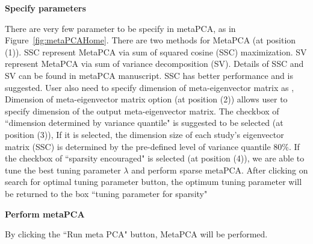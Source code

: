 \begin{steps}

\item \textbf{Specify parameters} 

There are very few parameter to be specify in metaPCA, as in Figure~\ref{fig:metaPCAHome}.
There are two methods for MetaPCA (at position {\color{red} (1)}). 
SSC represent MetaPCA via sum of squared cosine (SSC) maximization.
SV represent MetaPCA via sum of variance decomposition (SV).
Details of SSC and SV can be found in metaPCA manuscript.
SSC has better performance and is suggested.
User also need to specify dimension of meta-eigenvector matrix as , 
Dimension of meta-eigenvector matrix option (at position {\color{red} (2)}) allows user to specify dimension of the output meta-eigenvector matrix.
The checkbox of ``dimension determined by variance quantile" is suggested to be selected (at position {\color{red} (3)}),
If it is selected, the dimension size of each study's eigenvector matrix (SSC) is determined  by the pre-defined level of variance quantile 80\%.
If the checkbox of ``sparsity encouraged" is selected (at position {\color{red} (4)}),
we are able to tune the best tuning parameter $\lambda$ and perform sparse metaPCA.
After clicking on search for optimal tuning parameter button, the optimum tuning parameter will be returned to the box ``tuning parameter for sparsity"

\item \textbf{Perform metaPCA} 

By clicking the ``Run meta PCA" button, MetaPCA will be performed.


\end{steps}

